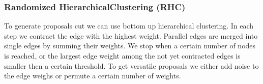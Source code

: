 \documentclass[10pt,twocolumn,letterpaper]{article}
\DeclareMathOperator*{\argmin}{arg\,min}
\DeclareMathOperator*{\argmax}{arg\,max}
\begin{document}
%



\subsubsection{Randomized HierarchicalClustering (RHC)}

To generate proposals cut we can use bottom up hierarchical clustering.
In each step we contract the edge with the highest weight.
Parallel edges are merged into single edges by summing their weights.
We stop when a certain number of nodes is reached, or the
largest edge weight among the not yet contracted edges is smaller then a certain threshold.
To get versatile proposals we either add noise 
to the edge weighs or permute a certain number of weights.
\end{document}
